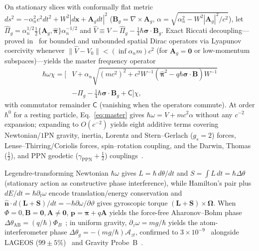 \documentclass[aps,prl,reprint,superscriptaddress,nofootinbib,floatfix]{revtex4-2}
\theoremstyle{prlthm}
\begin{document}
On stationary slices with conformally flat metric $ds^2=-\alpha_n^2c^2dt^2+W^2|d\mathbf{x}+\mathbf{A}_gdt|^2$ ($\mathbf{B}_g=\nabla\times\mathbf{A}_g$, $\alpha=\sqrt{\alpha_n^2-W^2|\mathbf{A}_g|^2/c^2}$), let $\hat{\Pi}_g=\alpha_n^{1/2}\tfrac{1}{2}\{\mathbf{A}_g,\hat{\boldsymbol{\pi}}\}\alpha_n^{-1/2}$ and $\hat{V}\equiv V-\hat{\Pi}_g-\tfrac{1}{4}\hbar\boldsymbol{\sigma}\cdot\mathbf{B}_g$. Exact Riccati decoupling---proved in~\citep{HutchisonWavefn2026} for bounded and unbounded spatial Dirac operators via Lyapunov coercivity whenever $\|\hat{V}-V_0\|<(\inf\alpha_n m)c^2$ (for $\mathbf{A}_g=\mathbf{0}$ or low-momentum subspaces)---yields the master frequency operator
\begin{equation}
  \begin{aligned}
  \hbar\omega\chi=\Big[&V+\alpha_n\sqrt{(mc^2)^2+c^2W^{-1}(\hat{\boldsymbol{\pi}}^2-q\hbar\boldsymbol{\sigma}\cdot\mathbf{B})W^{-1}}\\
  &-\hat{\Pi}_g-\tfrac{1}{4}\hbar\boldsymbol{\sigma}\cdot\mathbf{B}_g+\mathsf{C}\Big]\chi,
  \end{aligned}
  \label{eq:master}
\end{equation}
with commutator remainder $\mathsf{C}$ (vanishing when the operators commute). At order $\hbar^0$ for a resting particle, Eq.~\eqref{eq:master} gives $\hbar\omega=V+mc^2\alpha$ without any $c^{-2}$ expansion; expanding to $O(c^{-2})$ yields eight additive terms covering Newtonian/$1$PN gravity, inertia, Lorentz and Stern--Gerlach ($g_s=2$) forces, Lense--Thirring/Coriolis forces, spin--rotation coupling, and the Darwin, Thomas ($\tfrac{1}{2}$), and PPN geodetic ($\gamma_\text{PPN}+\tfrac{1}{2}$) couplings~\citep{Everitt2011Gravity,HutchisonWavefn2026}.

Legendre-transforming Newtonian $\hbar\omega$ gives $L=\hbar\,d\theta/dt$ and $S=\int L\,dt=\hbar\Delta\theta$ (stationary action as constructive phase interference), while Hamilton's pair plus $dE/dt=\hbar\partial_t\omega$ encode translation/energy conservation and $\hat{\mathbf{n}}\cdot d(\mathbf{L}+\mathbf{S})/dt=-\hbar\partial\omega/\partial\vartheta$ gives gyroscopic torque $(\mathbf{L}+\mathbf{S})\times\boldsymbol{\Omega}$. When $\Phi=0,\mathbf{B}=\mathbf{0},\mathbf{A}\neq\mathbf{0}$, $\mathbf{p}=\boldsymbol{\pi}+q\mathbf{A}$ yields the force-free Aharonov--Bohm phase $\Delta\theta_\text{AB}=(q/\hbar)\Phi_B$~\citep{Aharonov1959Significance}; in uniform gravity, $\partial_z\omega=mg/\hbar$ yields the atom-interferometer phase $\Delta\theta_g=-(mg/\hbar)\mathcal{A}_{zt}$, confirmed to $3\times 10^{-9}$~\citep{Peters1999Measurement} alongside LAGEOS ($99\pm 5\%$)~\citep{Ciufolini2004Confirmation} and Gravity Probe~B~\citep{Everitt2011Gravity}.
\end{document}
